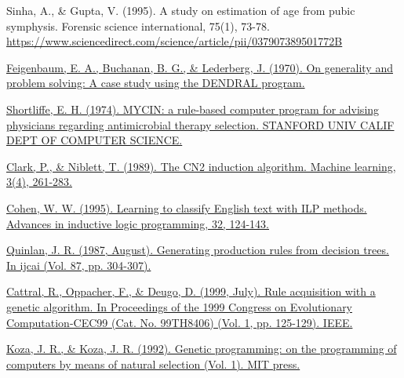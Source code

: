 \begin{thebibliography}{9}
	Sinha, A., \& Gupta, V. (1995). A study on estimation of age from pubic symphysis. Forensic science international, 75(1), 73-78. \url{https://www.sciencedirect.com/science/article/pii/037907389501772B}



	\href{https://www.researchgate.net/profile/Bruce-Buchanan/publication/23865744_On_generality_and_problem_solving_A_case_study_using_the_DENDRAL_program/links/0c96052e1e6f7e6a57000000/On-generality-and-problem-solving-A-case-study-using-the-DENDRAL-program.pdf}{Feigenbaum, E. A., Buchanan, B. G., \& Lederberg, J. (1970). On generality and problem solving: A case study using the DENDRAL program.}


	\href{https://apps.dtic.mil/sti/citations/ADA001373}{Shortliffe, E. H. (1974). MYCIN: a rule-based computer program for advising physicians regarding antimicrobial therapy selection. STANFORD UNIV CALIF DEPT OF COMPUTER SCIENCE.}


	\href{https://link.springer.com/article/10.1023/A:1022641700528}{Clark, P., \& Niblett, T. (1989). The CN2 induction algorithm. Machine learning, 3(4), 261-283.}


	\href{https://citeseerx.ist.psu.edu/viewdoc/download?doi=10.1.1.14.4483&rep=rep1&type=pdf}{Cohen, W. W. (1995). Learning to classify English text with ILP methods. Advances in inductive logic programming, 32, 124-143.}


	\href{https://citeseerx.ist.psu.edu/viewdoc/download?doi=10.1.1.98.9054&rep=rep1&type=pdf}{Quinlan, J. R. (1987, August). Generating production rules from decision trees. In ijcai (Vol. 87, pp. 304-307).}


	\href{https://ieeexplore.ieee.org/abstract/document/781916}{Cattral, R., Oppacher, F., \& Deugo, D. (1999, July). Rule acquisition with a genetic algorithm. In Proceedings of the 1999 Congress on Evolutionary Computation-CEC99 (Cat. No. 99TH8406) (Vol. 1, pp. 125-129). IEEE.}


	\href{https://mitpress.mit.edu/books/genetic-programming}{Koza, J. R., \& Koza, J. R. (1992). Genetic programming: on the programming of computers by means of natural selection (Vol. 1). MIT press.}


\end{thebibliography}
